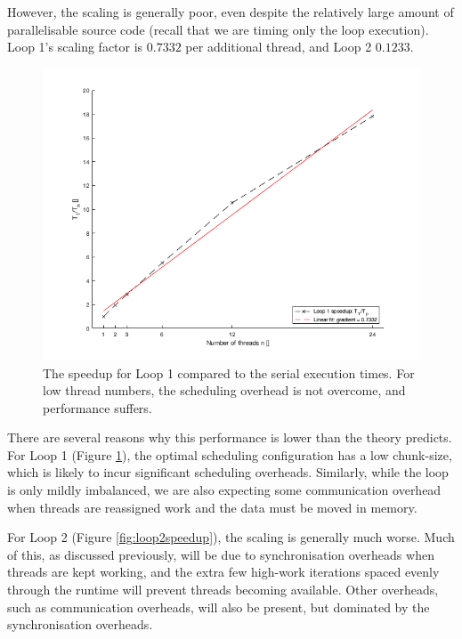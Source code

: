 \documentclass{article} %
\begin{document}
However, the scaling is generally poor, even despite the relatively large amount of parallelisable source code (recall that we are timing only the loop execution).
Loop 1's scaling factor is $0.7332$ per additional thread, and Loop 2 $0.1233$. 

\begin{figure}
    \centering
    \includegraphics[height=.35\textheight]{part1_plots/loop1_speedup.png}
    \caption{The speedup for Loop 1 compared to the serial execution times. For low thread numbers, the scheduling overhead is not overcome, and performance suffers.}
    \label{fig:loop1speedup}
\end{figure}

There are several reasons why this performance is lower than the theory predicts. 
For Loop 1 (Figure \ref{fig:loop1speedup}), the optimal scheduling configuration has a low chunk-size, which is likely to incur significant scheduling overheads.
Similarly, while the loop is only mildly imbalanced, we are also expecting some communication overhead when threads are reassigned work and the data must be moved in memory.

For Loop 2 (Figure \ref{fig:loop2speedup}), the scaling is generally much worse.
Much of this, as discussed previously, will be due to synchronisation overheads when threads are kept working, and the extra few high-work iterations spaced evenly through the runtime will prevent threads becoming available.
Other overheads, such as communication overheads, will also be present, but dominated by the synchronisation overheads.
\end{document}
